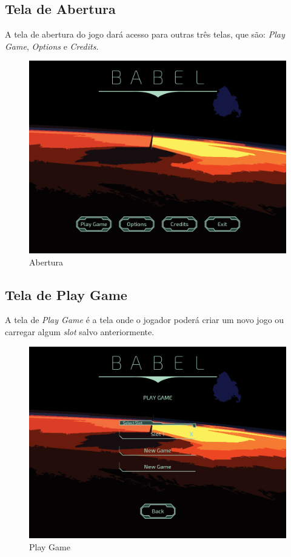 \documentclass[11pt]{article} %
\begin{document}
\subsection{Tela de Abertura}

A tela de abertura do jogo dará acesso para outras três telas, que são: \textit{Play Game}, \textit{Options} e \textit{Credits}.

\begin{figure}[!htp]
\centering
\includegraphics[scale=0.25]{res/abertura.png}
\caption{Abertura}
\label{Abertura}
\end{figure}

\subsection{Tela de Play Game}

A tela de \textit{Play Game} é a tela onde o jogador poderá criar um novo jogo ou carregar algum \textit{slot} salvo anteriormente.

\begin{figure}[!htp]
\centering
\includegraphics[scale=0.25]{res/load.png}
\caption{Play Game}
\label{Play Game}
\end{figure}
\end{document}
